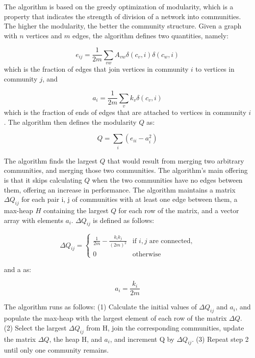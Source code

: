 The algorithm is based on the greedy optimization of modularity, which is a property that indicates the strength of division of a network into communities. The higher the modularity, the better the community structure. Given a graph with $n$ vertices and $m$ edges, the algorithm defines two quantities, namely:


\begin{equation}
	e_{ij} = \frac{1}{2m} \sum_{vw}{A_{vw}\delta(c_v,i)\delta(c_w,i)}
\end{equation}which is the fraction of edges that join vertices in community $i$ to vertices in community $j$, and


\begin{equation}
	a_i = \frac{1}{2m} \sum_{v}{k_v\delta(c_v,i)}
\end{equation}which is the fraction of ends of edges that are attached to vertices in community $i$. The algorithm then defines the modularity $Q$ as:


\begin{equation}
	Q = \sum_{i}({e_{ii}-a_i^2})
\end{equation}


The algorithm finds the largest $Q$ that would result from merging two arbitrary communities, and merging those two communities. The algorithm's main offering is that it skips calculating $Q$ when the two communities have no edges between them, offering an increase in performance. The algorithm maintains a matrix $\Delta Q_{ij}$ for each pair i, j of communities with at least one edge between them, a max-heap $H$ containing the largest $Q$ for each row of the matrix, and a vector array with elements $a_{i}$. $\Delta Q_{ij}$ is defined as follows:


\begin{equation}
	\Delta Q_{ij} =
	\begin {cases}
	\frac{1}{2m}-\frac{k_ik_j}{(2m)^2} &\text{if }i, j\text{ are connected,}
	\\ 0 & \text{otherwise}
\end{cases}
\end{equation}


and a as:


\begin{equation}
	a_i = \frac{k_i}{2m}
\end{equation}


The algorithm runs as follows:
(1) Calculate the initial values of $\Delta Q_{ij}$ and $a_{i}$, and populate the max-heap with the largest element of each row of the matrix $\Delta Q$.
(2) Select the largest $\Delta Q_{ij}$ from H, join the corresponding
communities, update the matrix $\Delta Q$, the heap H, and $a_{i}$, and increment Q by $\Delta Q_{ij}$.
(3) Repeat step 2 until only one community remains.


